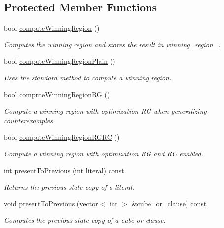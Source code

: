 \subsection*{Protected Member Functions}
\begin{DoxyCompactItemize}
\item 
bool \hyperlink{classLearnSynthSAT_a055b4699184d09bb7f6b15052ac684db}{compute\-Winning\-Region} ()
\begin{DoxyCompactList}\small\item\em Computes the winning region and stores the result in \hyperlink{classLearnSynthSAT_aced2bce789c7a93ed4b5391dd0690616}{winning\-\_\-region\-\_\-}. \end{DoxyCompactList}\item 
bool \hyperlink{classLearnSynthSAT_a49541a9cff8002ca31e0044ae35546a2}{compute\-Winning\-Region\-Plain} ()
\begin{DoxyCompactList}\small\item\em Uses the standard method to compute a winning region. \end{DoxyCompactList}\item 
bool \hyperlink{classLearnSynthSAT_aa981048565f10183c30c4dc0576de6b6}{compute\-Winning\-Region\-R\-G} ()
\begin{DoxyCompactList}\small\item\em Compute a winning region with optimization R\-G when generalizing counterexamples. \end{DoxyCompactList}\item 
bool \hyperlink{classLearnSynthSAT_a2d54b84ce5e87b7b2d398226faa501b0}{compute\-Winning\-Region\-R\-G\-R\-C} ()
\begin{DoxyCompactList}\small\item\em Compute a winning region with optimization R\-G and R\-C enabled. \end{DoxyCompactList}\item 
int \hyperlink{classLearnSynthSAT_ab7a72deebcdf330a28931720d085547d}{present\-To\-Previous} (int literal) const 
\begin{DoxyCompactList}\small\item\em Returns the previous-\/state copy of a literal. \end{DoxyCompactList}\item 
void \hyperlink{classLearnSynthSAT_a5340af48fec2799116e4271eddff6c92}{present\-To\-Previous} (vector$<$ int $>$ \&cube\-\_\-or\-\_\-clause) const 
\begin{DoxyCompactList}\small\item\em Computes the previous-\/state copy of a cube or clause. \end{DoxyCompactList}\item 

\end{DoxyCompactItemize}
